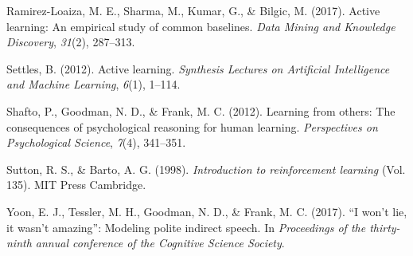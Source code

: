 \documentclass[10pt, letterpaper]{article}
\begin{document}
\hypertarget{ref-ramirez2017active}{}
Ramirez-Loaiza, M. E., Sharma, M., Kumar, G., \& Bilgic, M. (2017).
Active learning: An empirical study of common baselines. \emph{Data
Mining and Knowledge Discovery}, \emph{31}(2), 287--313.

\hypertarget{ref-settles2012active}{}
Settles, B. (2012). Active learning. \emph{Synthesis Lectures on
Artificial Intelligence and Machine Learning}, \emph{6}(1), 1--114.

\hypertarget{ref-shafto2012learning}{}
Shafto, P., Goodman, N. D., \& Frank, M. C. (2012). Learning from
others: The consequences of psychological reasoning for human learning.
\emph{Perspectives on Psychological Science}, \emph{7}(4), 341--351.

\hypertarget{ref-sutton1998}{}
Sutton, R. S., \& Barto, A. G. (1998). \emph{Introduction to
reinforcement learning} (Vol. 135). MIT Press Cambridge.

\hypertarget{ref-yoon2017}{}
Yoon, E. J., Tessler, M. H., Goodman, N. D., \& Frank, M. C. (2017). ``I
won't lie, it wasn't amazing'': Modeling polite indirect speech. In
\emph{Proceedings of the thirty-ninth annual conference of the Cognitive
Science Society}.
\end{document}
